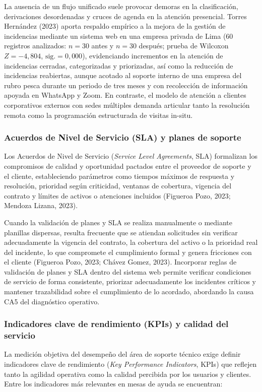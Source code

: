 La ausencia de un flujo unificado suele provocar demoras en la clasificación, derivaciones desordenadas y cruces de agenda en la atención presencial. Torres Hernández (2023) aporta respaldo empírico a la mejora de la gestión de incidencias mediante un sistema web en una empresa privada de Lima (60 registros analizados: $n=30$ antes y $n=30$ después; prueba de Wilcoxon $Z=-4,804$, $\text{sig.}=0,000$), evidenciando incrementos en la atención de incidencias cerradas, categorizadas y priorizadas, así como la reducción de incidencias reabiertas, aunque acotado al soporte interno de una empresa del rubro pesca durante un periodo de tres meses y con recolección de información apoyada en WhatsApp y Zoom. En contraste, el modelo de atención a clientes corporativos externos con sedes múltiples demanda articular tanto la resolución remota como la programación estructurada de visitas in-situ.

\subsubsection{Acuerdos de Nivel de Servicio (SLA) y planes de soporte}
Los Acuerdos de Nivel de Servicio (\textit{Service Level Agreements}, SLA) formalizan los compromisos de calidad y oportunidad pactados entre el proveedor de soporte y el cliente, estableciendo parámetros como tiempos máximos de respuesta y resolución, prioridad según criticidad, ventanas de cobertura, vigencia del contrato y límites de activos o atenciones incluidos (Figueroa Pozo, 2023; Mendoza Lizana, 2023).

Cuando la validación de planes y SLA se realiza manualmente o mediante planillas dispersas, resulta frecuente que se atiendan solicitudes sin verificar adecuadamente la vigencia del contrato, la cobertura del activo o la prioridad real del incidente, lo que compromete el cumplimiento formal y genera fricciones con el cliente (Figueroa Pozo, 2023; Chávez Gomez, 2023). Incorporar reglas de validación de planes y SLA dentro del sistema web permite verificar condiciones de servicio de forma consistente, priorizar adecuadamente los incidentes críticos y mantener trazabilidad sobre el cumplimiento de lo acordado, abordando la causa CA5 del diagnóstico operativo.

\subsubsection{Indicadores clave de rendimiento (KPIs) y calidad del servicio}
La medición objetiva del desempeño del área de soporte técnico exige definir indicadores clave de rendimiento (\textit{Key Performance Indicators}, KPIs) que reflejen tanto la agilidad operativa como la calidad percibida por los usuarios y clientes. Entre los indicadores más relevantes en mesas de ayuda se encuentran:

